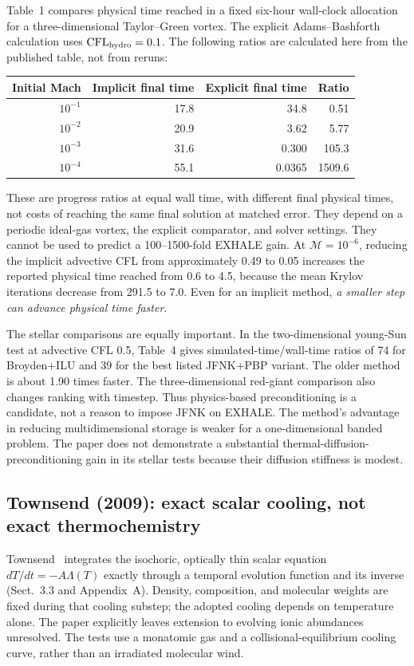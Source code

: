 \documentclass[english,a4paper]{my_memo}
\begin{document}
Table~1 compares physical time reached in a fixed six-hour wall-clock allocation for a three-dimensional Taylor--Green vortex. The explicit Adams--Bashforth calculation uses $\mathrm{CFL}_{\rm hydro}=0.1$. The following ratios are calculated here from the published table, not from reruns:
\begin{center}
\begin{tabular}{@{}rrrr@{}}
\toprule
Initial Mach & Implicit final time & Explicit final time & Ratio\\
\midrule
$10^{-1}$ & 17.8 & 34.8 & 0.51\\
$10^{-2}$ & 20.9 & 3.62 & 5.77\\
$10^{-3}$ & 31.6 & 0.300 & 105.3\\
$10^{-4}$ & 55.1 & 0.0365 & 1509.6\\
\bottomrule
\end{tabular}
\end{center}
These are progress ratios at equal wall time, with different final physical times, not costs of reaching the same final solution at matched error. They depend on a periodic ideal-gas vortex, the explicit comparator, and solver settings. They cannot be used to predict a 100--1500-fold EXHALE gain. At $\mathcal M=10^{-6}$, reducing the implicit advective CFL from approximately 0.49 to 0.05 increases the reported physical time reached from 0.6 to 4.5, because the mean Krylov iterations decrease from 291.5 to 7.0. Even for an implicit method, \emph{a smaller step can advance physical time faster}.

The stellar comparisons are equally important. In the two-dimensional young-Sun test at advective CFL 0.5, Table~4 gives simulated-time/wall-time ratios of 74 for Broyden+ILU and 39 for the best listed JFNK+PBP variant. The older method is about 1.90 times faster. The three-dimensional red-giant comparison also changes ranking with timestep. Thus physics-based preconditioning is a candidate, not a reason to impose JFNK on EXHALE. The method's advantage in reducing multidimensional storage is weaker for a one-dimensional banded problem. The paper does not demonstrate a substantial thermal-diffusion-preconditioning gain in its stellar tests because their diffusion stiffness is modest.

\subsection{Townsend (2009): exact scalar cooling, not exact thermochemistry}
Townsend\ \cite{townsend} integrates the isochoric, optically thin scalar equation $dT/dt=-A\Lambda(T)$ exactly through a temporal evolution function and its inverse (Sect.~3.3 and Appendix~A). Density, composition, and molecular weights are fixed during that cooling substep; the adopted cooling depends on temperature alone. The paper explicitly leaves extension to evolving ionic abundances unresolved. The tests use a monatomic gas and a collisional-equilibrium cooling curve, rather than an irradiated molecular wind.
\end{document}

